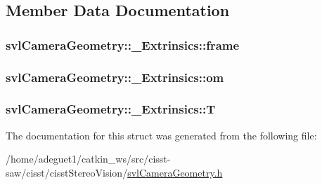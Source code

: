 \subsection{Member Data Documentation}
\hypertarget{structsvl_camera_geometry_1_1___extrinsics_a5cfad30329c5074e76e57eaf85b4737f}{
\subsubsection[{frame}]{ svl\-Camera\-Geometry\-::\-\_\-\-Extrinsics\-::frame}}\label{structsvl_camera_geometry_1_1___extrinsics_a5cfad30329c5074e76e57eaf85b4737f}
\hypertarget{structsvl_camera_geometry_1_1___extrinsics_afeaca93a0c8c4b674c81a785b3aeda35}{
\subsubsection[{om}]{ svl\-Camera\-Geometry\-::\-\_\-\-Extrinsics\-::om}}\label{structsvl_camera_geometry_1_1___extrinsics_afeaca93a0c8c4b674c81a785b3aeda35}
\hypertarget{structsvl_camera_geometry_1_1___extrinsics_aa41edbc90833a086ff1fff5c11fa7eb8}{
\subsubsection[{T}]{ svl\-Camera\-Geometry\-::\-\_\-\-Extrinsics\-::\-T}}\label{structsvl_camera_geometry_1_1___extrinsics_aa41edbc90833a086ff1fff5c11fa7eb8}


The documentation for this struct was generated from the following file\-:\begin{DoxyCompactItemize}
\item 
/home/adeguet1/catkin\-\_\-ws/src/cisst-\/saw/cisst/cisst\-Stereo\-Vision/\hyperlink{svl_camera_geometry_8h}{svl\-Camera\-Geometry.\-h}\end{DoxyCompactItemize}
